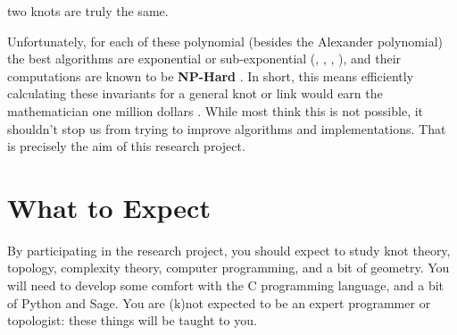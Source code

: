 \documentclass{article}
\begin{document}
        two knots are truly the same.
        \par\hfill\par
        Unfortunately, for each of these polynomial (besides the Alexander
        polynomial) the best algorithms are exponential or sub-exponential
        (\cite{Burton2018HOMFLFixedParameter},
        \cite{ThistlethwaiteSpanningTree},
        \cite{Przytycka1991SubexponentiallyCT},
        \cite{MaguireJones}),
        and their computations are known to be \textbf{NP-Hard}
        \cite{HOMFLYPTNPHard}. In short, this means efficiently calculating
        these invariants for a general knot or link would earn the
        mathematician one million dollars \cite{Blank2000TheMP}.
        While most think this is not possible, it shouldn't stop us from
        trying to improve algorithms and implementations. That is precisely
        the aim of this research project.
    \section{What to Expect}
        By participating in the research project, you should expect to study
        knot theory, topology, complexity theory, computer programming, and a
        bit of geometry. You will need to develop some comfort with the
        C programming language, and a bit of Python and Sage. You are (k)not
        expected to be an expert programmer or topologist: these things will be
        taught to you.
    \par\hfill\par
    
    
\end{document}
